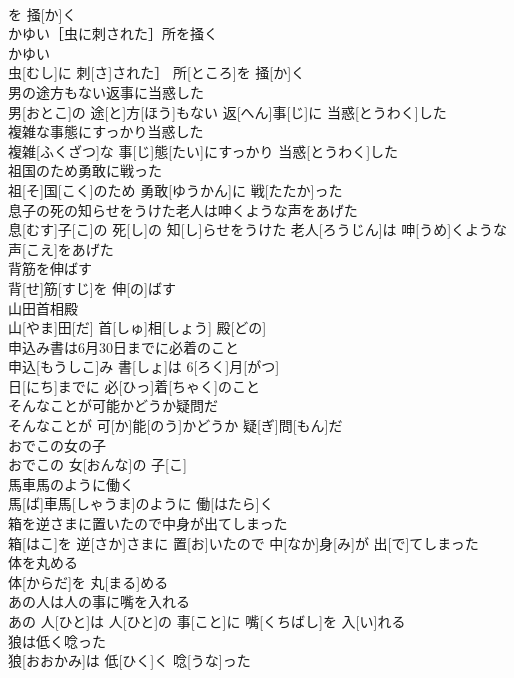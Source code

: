 \documentclass[8pt]{extreport}
\begin{document}
\begin{CJK}{UTF8}{min}
\\	を 掻[か]く 
\\	かゆい［虫に刺された］所を掻く	
\\	かゆい
\\	虫[むし]に 刺[さ]された］ 所[ところ]を 掻[か]く
\\	男の途方もない返事に当惑した	
\\	男[おとこ]の 途[と]方[ほう]もない 返[へん]事[じ]に 当惑[とうわく]した
\\	複雑な事態にすっかり当惑した	
\\	複雑[ふくざつ]な 事[じ]態[たい]にすっかり 当惑[とうわく]した
\\	祖国のため勇敢に戦った	
\\	祖[そ]国[こく]のため 勇敢[ゆうかん]に 戦[たたか]った
\\	息子の死の知らせをうけた老人は呻くような声をあげた	
\\	息[むす]子[こ]の 死[し]の 知[し]らせをうけた 老人[ろうじん]は 呻[うめ]くような 声[こえ]をあげた
\\	背筋を伸ばす	
\\	背[せ]筋[すじ]を 伸[の]ばす
\\	山田首相殿	
\\	山[やま]田[だ] 首[しゅ]相[しょう] 殿[どの]
\\	申込み書は6月30日までに必着のこと	
\\	申込[もうしこ]み 書[しょ]は 6[ろく]月[がつ] 
\\	日[にち]までに 必[ひっ]着[ちゃく]のこと
\\	そんなことが可能かどうか疑問だ	
\\	そんなことが 可[か]能[のう]かどうか 疑[ぎ]問[もん]だ
\\	おでこの女の子	
\\	おでこの 女[おんな]の 子[こ]
\\	馬車馬のように働く	
\\	馬[ば]車馬[しゃうま]のように 働[はたら]く
\\	箱を逆さまに置いたので中身が出てしまった	
\\	箱[はこ]を 逆[さか]さまに 置[お]いたので 中[なか]身[み]が 出[で]てしまった
\\	体を丸める	
\\	体[からだ]を 丸[まる]める
\\	あの人は人の事に嘴を入れる	
\\	あの 人[ひと]は 人[ひと]の 事[こと]に 嘴[くちばし]を 入[い]れる
\\	狼は低く唸った	
\\	狼[おおかみ]は 低[ひく]く 唸[うな]った

\end{CJK}
\end{document}
